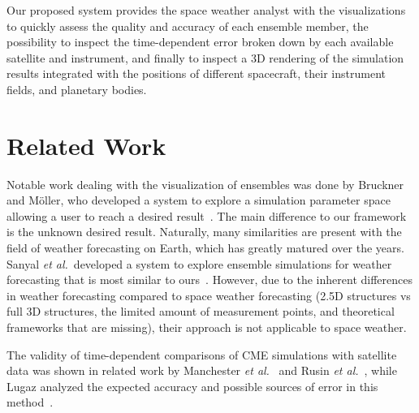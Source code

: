 \documentclass{vgtc}                          %
\def\etal{\textit{et al.}}
\begin{document}
Our proposed system provides the space weather analyst with the visualizations to quickly assess the quality and accuracy of each ensemble member, the possibility to inspect the time-dependent error broken down by each available satellite and instrument, and finally to inspect a 3D rendering of the simulation results integrated with the positions of different spacecraft, their instrument fields, and planetary bodies.

\section{Related Work}
Notable work dealing with the visualization of ensembles was done by Bruckner and M\"oller, who developed a system to explore a simulation parameter space allowing a user to reach a desired result~\cite{bruckner2010result}. The main difference to our framework is the unknown desired result. Naturally, many similarities are present with the field of weather forecasting on Earth, which has greatly matured over the years. Sanyal \etal\ developed a system to explore ensemble simulations for weather forecasting that is most similar to ours~\cite{sanyal2010noodles}. However, due to the inherent differences in weather forecasting compared to space weather forecasting (2.5D structures vs full 3D structures, the limited amount of measurement points, and theoretical frameworks that are missing), their approach is not applicable to space weather.

The validity of time-dependent comparisons of CME simulations with satellite data was shown in related work by Manchester \etal ~\cite{manchester2008three} and Rusin \etal ~\cite{rusin2010comparing}, while Lugaz analyzed the expected accuracy and possible sources of error in this method~\cite{lugaz2010accuracy}.
\end{document}
